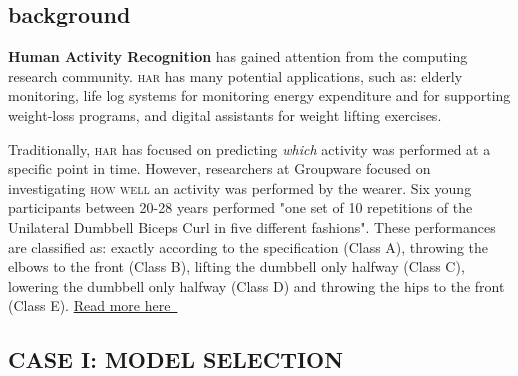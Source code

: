 \documentclass[10pt, twoside]{article}
\let\orighref\href
\renewcommand{\href}[2]{\orighref{#1}{#2\,\faExternalLink}}
\begin{document}
\vspace{6ex}

\begin{center}
\subsection{background}
\vspace{-3ex}
\end{center}

\noindent
\textbf{Human Activity Recognition} has gained attention from the computing research community.
\textsc{har} has many potential applications, such as: elderly monitoring, life log systems for
monitoring energy expenditure and for supporting weight-loss programs, and digital assistants
for weight lifting exercises.
\smallskip

Traditionally, \textsc{har} has focused on predicting \emph{which} activity was performed at a specific
point in time. However, researchers at Groupware focused on investigating \textsc{how well} an
activity was performed by the wearer. Six young participants between 20-28 years performed
"one set of 10 repetitions of the Unilateral Dumbbell Biceps Curl in five different fashions".
These performances are classified as: exactly according to the specification (Class A),
throwing the elbows to the front (Class B), lifting the dumbbell only halfway (Class C),
lowering the dumbbell only halfway (Class D) and throwing the hips to the front (Class E).
\href{http://web.archive.org/web/20161224072740/http:/groupware.les.inf.puc-rio.br/har}{Read more here  }
\bigskip

\begin{center}
\section{CASE I: MODEL SELECTION}
\vspace{-3ex}
\end{center}
\end{document}
